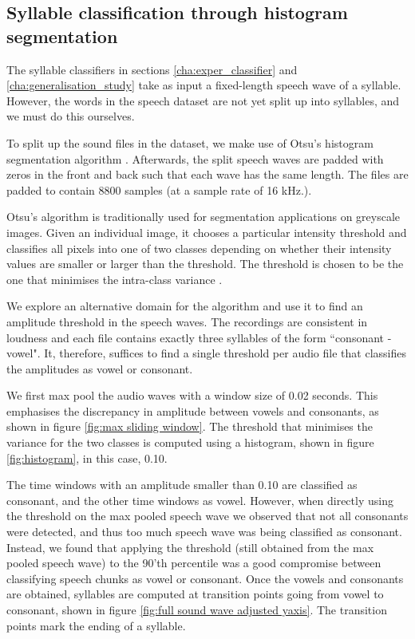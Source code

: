 \begin{appendices}
	\chapter{Syllable classification through histogram segmentation} \label{appendix:split_syllables}
	The syllable classifiers in sections \ref{cha:exper_classifier} and \ref{cha:generalisation_study} take as input a fixed-length speech wave of a syllable. However, the words in the speech dataset are not yet split up into syllables, and we must do this ourselves.
	
	To split up the sound files in the dataset, we make use of Otsu's histogram segmentation algorithm \citep{otsuTlresholdSelectionMethod1979}. Afterwards, the split speech waves are padded with zeros in the front and back such that each wave has the same length. The files are padded to contain 8800 samples (at a sample rate of 16 kHz.).
	
	Otsu's algorithm is traditionally used for segmentation applications on greyscale images. Given an individual image, it chooses a particular intensity threshold and classifies all pixels into one of two classes depending on whether their intensity values are smaller or larger than the threshold. The threshold is chosen to be the one that minimises the intra-class variance \cite{OtsuMethod2023}. 
	
	We explore an alternative domain for the algorithm and use it to find an amplitude threshold in the speech waves. The recordings are consistent in loudness and each file contains exactly three syllables of the form ``consonant - vowel". It, therefore, suffices to find a single threshold per audio file that classifies the amplitudes as vowel or consonant.
	
	We first max pool the audio waves with a window size of 0.02 seconds. This emphasises the discrepancy in amplitude between vowels and consonants, as shown in figure \ref{fig:max sliding window}. The threshold that minimises the variance for the two classes is computed using a histogram, shown in figure \ref{fig:histogram}, in this case, 0.10. 
	
	The time windows with an amplitude smaller than 0.10 are classified as consonant, and the other time windows as vowel. However, when directly using the threshold on the max pooled speech wave we observed that not all consonants were detected, and thus too much speech wave was being classified as consonant. Instead, we found that applying the threshold (still obtained from the max pooled speech wave) to the 90'th percentile was a good compromise between classifying speech chunks as vowel or consonant. Once the vowels and consonants are obtained, syllables are computed at transition points going from vowel to consonant, shown in figure \ref{fig:full sound wave adjusted yaxis}. The transition points mark the ending of a syllable.


\end{appendices}
